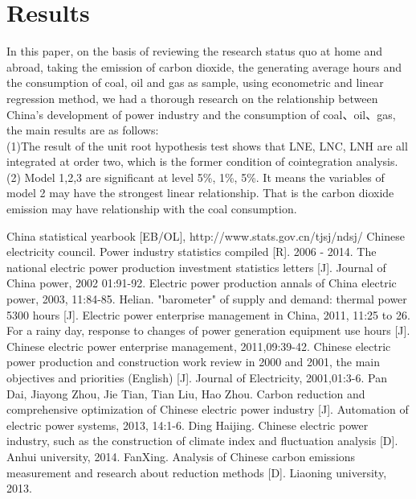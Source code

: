 \documentclass{article}
\begin{document}
  \section{Results}In this paper, on the basis of reviewing the research status quo at home and abroad, taking the emission of carbon dioxide, the generating average hours and the consumption of coal, oil and gas as sample, using econometric and linear regression method, we had a thorough research on the relationship between China's development of power industry and the consumption of coal、oil、gas, the main results are as follows:
  \\(1)The result of the unit root hypothesis test  shows that LNE, LNC, LNH   are all integrated at order two, which is the former condition of cointegration analysis.
  \\(2) Model 1,2,3 are significant at level 5\%, 1\%, 5\%. It means the variables of model 2 may have the strongest linear relationship. That is the carbon dioxide emission may have relationship with the coal consumption.
 
 
\begin{thebibliography}{10}
China statistical yearbook [EB/OL], http://www.stats.gov.cn/tjsj/ndsj/
Chinese electricity council. Power industry statistics compiled [R]. 2006 - 2014.
The national electric power production investment statistics letters [J]. Journal of China power, 2002 01:91-92.
Electric power production annals of China electric power, 2003, 11:84-85.
Helian. "barometer" of supply and demand: thermal power 5300 hours [J]. Electric power enterprise management in China, 2011, 11:25 to 26.
For a rainy day, response to changes of power generation equipment use hours  [J]. Chinese electric power enterprise management, 2011,09:39-42.
Chinese electric power production and construction work review in 2000 and 2001, the main objectives and priorities (English) [J]. Journal of Electricity, 2001,01:3-6.
Pan Dai, Jiayong Zhou, Jie Tian, Tian Liu, Hao Zhou. Carbon reduction and  comprehensive optimization of Chinese electric power industry  [J]. Automation of electric power systems, 2013, 14:1-6.
Ding Haijing. Chinese electric power industry, such as the construction of climate index and fluctuation analysis [D]. Anhui university, 2014.
FanXing. Analysis of Chinese carbon emissions measurement and research about reduction methods [D]. Liaoning university, 2013.
\end{thebibliography}
\end{document}
